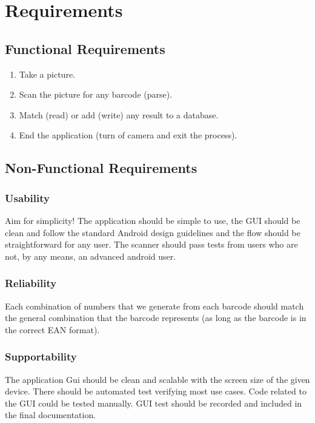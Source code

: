 \documentclass{report}
\begin{document}
\chapter{Requirements}

\section{Functional Requirements}

\begin{enumerate}
  \item Take a picture.
  \item Scan the picture for any barcode (parse).
  \item Match (read) or add (write) any result to a database.
  \item End the application (turn of camera and exit the process).
\end{enumerate}

\section{Non-Functional Requirements}

\subsection{Usability}
Aim for simplicity! The application should be simple to use, the GUI should be clean and follow the standard Android design guidelines\cite{website:androiddesign} and the flow should be straightforward for any user. The scanner should pass tests from users who are not, by any means, an advanced android user.

\subsection{Reliability}
Each combination of numbers that we generate from each barcode should match the general combination that the barcode represents (as long as the barcode is in the correct EAN format).

\subsection{Supportability}
The application Gui should be clean and scalable with the screen size of the given device.
There should be automated test verifying most use cases. Code related to the GUI could be tested manually. GUI test should be recorded and included in the final documentation.
\end{document}
